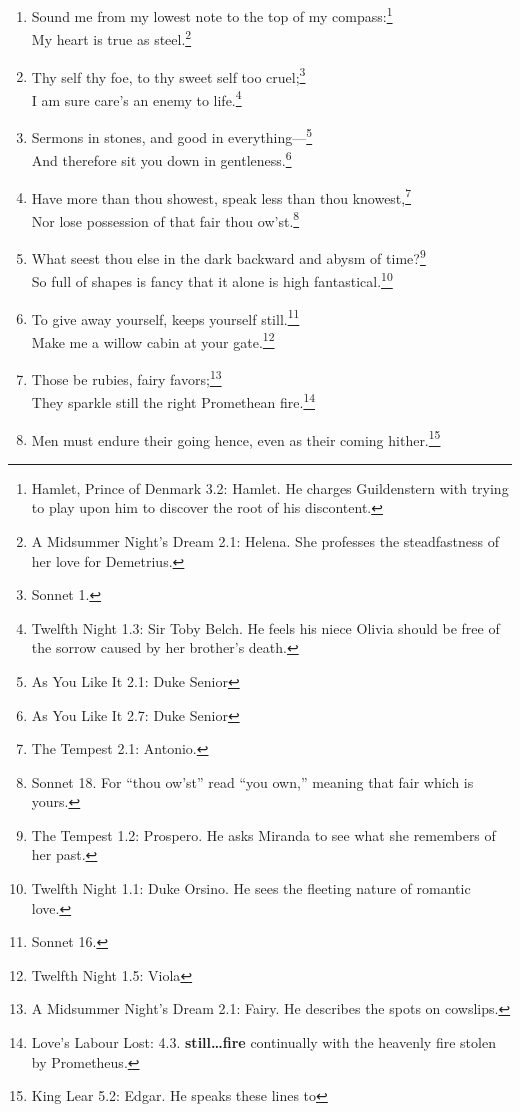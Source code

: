 \documentclass[17pt,twoside]{extarticle}
\begin{document}
\begin{enumerate}
  the bettering of my mind.\footnote{The Tempest 1.2: Prospero.}
\item
  Sound me from my lowest note to the top of my compass:\footnote{Hamlet,
    Prince of Denmark 3.2: Hamlet. He charges Guildenstern with trying
    to play upon him to discover the root of his discontent.}\\My heart
  is true as steel.\footnote{A Midsummer Night's Dream 2.1: Helena. She
    professes the steadfastness of her love for Demetrius.}
\item
  Thy self thy foe, to thy sweet self too cruel;\footnote{Sonnet 1.}\\I
  am sure care's an enemy to life.\footnote{Twelfth Night 1.3: Sir Toby
    Belch. He feels his niece Olivia should be free of the sorrow caused
    by her brother's death.}
\item
  Sermons in stones, and good in everything---\footnote{As You Like It
    2.1: Duke Senior}\\And therefore sit you down in
  gentleness.\footnote{As You Like It 2.7: Duke Senior}
\item
  Have more than thou showest, speak less than thou knowest,\footnote{The
    Tempest 2.1: Antonio.}\\Nor lose possession of that fair thou
  ow'st.\footnote{Sonnet 18. For ``thou ow'st'' read ``you own,''
    meaning that fair which is yours.}
\item
  What seest thou else in the dark backward and abysm of time?\footnote{The
    Tempest 1.2: Prospero. He asks Miranda to see what she remembers of
    her past.}\\So full of shapes is fancy that it alone is high
  fantastical.\footnote{Twelfth Night 1.1: Duke Orsino. He sees the
    fleeting nature of romantic love.}
\item
  To give away yourself, keeps yourself still.\footnote{Sonnet 16.}\\Make
  me a willow cabin at your gate.\footnote{Twelfth Night 1.5: Viola}
\item
  Those be rubies, fairy favors;\footnote{A Midsummer Night's Dream 2.1:
    Fairy. He describes the spots on cowslips.}\\They sparkle still the
  right Promethean fire.\footnote{Love's Labour Lost: 4.3.
    \textbf{still\ldots{}fire} continually with the heavenly fire stolen
    by Prometheus.}
\item
  Men must endure their going hence, even as their coming
  hither.\footnote{King Lear 5.2: Edgar. He speaks these lines to
}
\end{enumerate}
\end{document}
